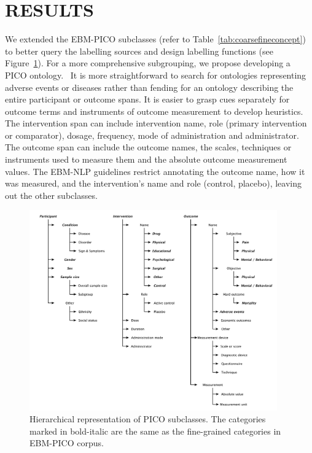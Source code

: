 \documentclass[10.7pt,]{article}
\begin{document}
\section{RESULTS}\label{results}
%
We extended the EBM-PICO subclasses (refer to Table~\ref{tab:coarsefineconcept}) to better query the labelling sources and design labelling functions (see Figure~\ref{fig:target_subgroups}).
For a more comprehensive subgrouping, we propose developing a PICO ontology.~\cite{sanchez2022annotated}
It is more straightforward to search for ontologies representing adverse events or diseases rather than fending for an ontology describing the entire participant or outcome spans.
It is easier to grasp cues separately for outcome terms and instruments of outcome measurement to develop heuristics.
The intervention span can include intervention name, role (primary intervention or comparator), dosage, frequency, mode of administration and administrator.
The outcome span can include the outcome names, the scales, techniques or instruments used to measure them and the absolute outcome measurement values.
The EBM-NLP guidelines restrict annotating the outcome name, how it was measured, and the intervention's name and role (control, placebo), leaving out the other subclasses.
%
\begin{figure}[ht]
\centering
\includegraphics[width=0.95\textwidth]{figures/target_subgroups_.pdf}
\caption{\label{fig:target_subgroups} Hierarchical representation of PICO subclasses. The categories marked in bold-italic are the same as the fine-grained categories in EBM-PICO corpus.}
\end{figure}
\end{document}

